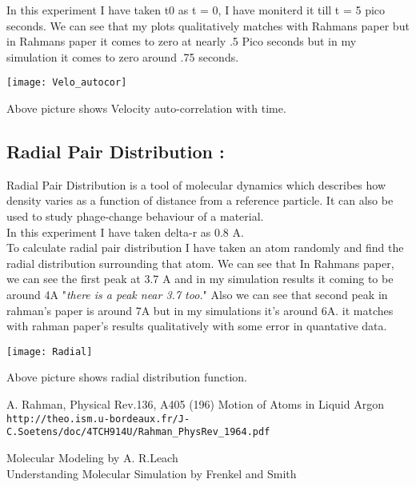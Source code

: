 \documentclass[11pt]{article}
\begin{document}
In this experiment I have taken t0 as t = 0, I have moniterd it till t = 5 pico seconds. We can see that my plots qualitatively matches with Rahmans paper but in Rahmans paper it comes to zero at nearly .5 Pico seconds but in my simulation it comes to zero around .75 seconds.\\


\vspace{.2cm}


\texttt{[image: Velo\_autocor]}

\vspace{.7cm}

Above picture shows Velocity auto-correlation with time.

\subsection{Radial Pair Distribution : }

\vspace{.2cm}

Radial Pair Distribution is a tool of molecular dynamics which describes how density varies as a function of distance from a reference particle. It can also be used to study phage-change behaviour of a material.\\

In this experiment I have taken delta-r as 0.8 A. \\
To calculate radial pair distribution I have taken an atom randomly and find the radial distribution surrounding that atom. We can see that In Rahmans paper, we can see the first peak at 3.7 A and in my simulation results it coming to be around 4A "{\it there is a peak near 3.7 too.}" Also we can see that second peak in rahman's paper is around 7A but in my simulations it's around 6A. it matches with rahman paper's results qualitatively with some error in quantative data.


\texttt{[image: Radial]}


\vspace{.4cm}


Above picture shows radial distribution function.

\vspace{.7cm}



\begin{thebibliography}{9}
	 A. Rahman,  Physical Rev.136,  A405 (196) 
	 Motion of Atoms in Liquid Argon
	 \\\texttt{http://theo.ism.u-bordeaux.fr/J-C.Soetens/doc/4TCH914U/Rahman\_PhysRev\_1964.pdf}
	
	
	Molecular Modeling by A. R.Leach \\
	
	Understanding Molecular Simulation by Frenkel and Smith

\end{thebibliography}
\end{document}
